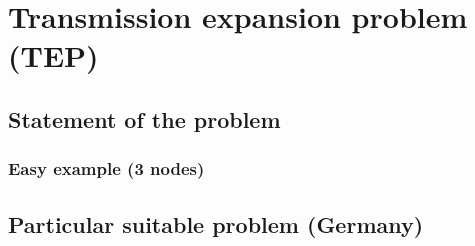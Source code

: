 
\chapter{Transmission expansion problem (TEP)} %

\label{Chapter3} %


\section{Statement of the problem}
\subsection{Easy example (3 nodes)}
\section{Particular suitable problem (Germany)}


